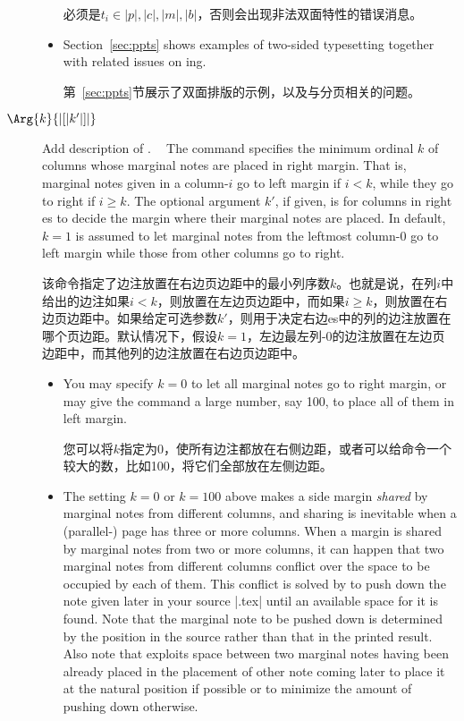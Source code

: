 \begin{description}
\begin{itemize}
必须是$t_i\in{|p|,|c|,|m|,|b|}$，否则会出现非法双面特性的错误消息。
\item
Section~\ref{sec:ppts} shows examples of two-sided typesetting together
with related issues on \parapag{}ing.

第~\ref{sec:ppts}节展示了双面排版的示例，以及与\parapag{}分页相关的问题。
\end{itemize}



\item[\Midx{\!\marginparthreshold!}$\Arg{k}{|[|k'|]|}$]\mbox{}\par
{}
{Add description of .}

The command specifies the minimum ordinal $k$ of columns whose marginal
notes are placed in right margin.  That is, marginal notes given in a
column-$i$ go to left margin if $i<k$, while they go to right if $i\geq
k$.  The optional argument $k'$, if given, is for columns in right
\parapag{}es to decide the margin where their marginal notes are placed.
In default, $k=1$ is assumed to let marginal notes from the leftmost
column-0 go to left margin while those from other columns go to right.

该命令指定了边注放置在右边页边距中的最小列序数$k$。也就是说，在列$i$中给出的边注如果$i<k$，则放置在左边页边距中，而如果$i\geq k$，则放置在右边页边距中。如果给定可选参数$k'$，则用于决定右边\parapag{}es中的列的边注放置在哪个页边距。默认情况下，假设$k=1$，左边最左列-0的边注放置在左边页边距中，而其他列的边注放置在右边页边距中。
\begin{itemize}
\item
You may specify $k=0$ to let all marginal notes go to right margin, or may
give the command a large number, say 100, to place all of them in left
margin.

您可以将$k$指定为0，使所有边注都放在右侧边距，或者可以给命令一个较大的数，比如100，将它们全部放在左侧边距。

\item
The setting $k=0$ or $k=100$ above makes a side margin \emph{shared} by
marginal notes from different columns, and sharing is inevitable when a
(parallel-) page has three or more columns.  When a margin is shared by
marginal notes from two or more columns, it can happen that two marginal
notes from different columns conflict over the space to be occupied by each
of them.  This conflict is solved by \Paracol{} to push down the note
given later in your source |.tex| until an available space for it is
found.  Note that the marginal note to be pushed down is determined by the
position in the source rather than that in the printed result.  Also note
that \Paracol{} exploits space between two marginal notes having been
already placed in the placement of other note coming later to place it at
the natural position if possible or to minimize the amount of pushing down
otherwise.


\end{itemize}
\end{description}
